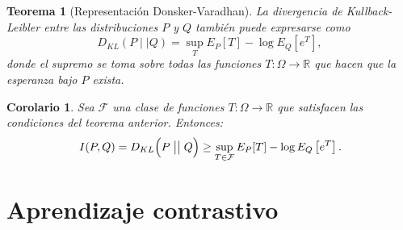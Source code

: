 \documentclass[aspectratio=169]{beamer}
\newcommand\KL[2]{D_{KL}\Big(#1 \bigm|\bigm| #2\Big)}
\newcommand{\R}{\mathbb{R}}
\newtheorem{nth}{Teorema}
\newtheorem{cor}{Corolario}
\begin{document}
\begin{frame}
  
  
  \begin{nth}[Representación Donsker-Varadhan]
  La divergencia de Kullback-Leibler entre las distribuciones \(P\) y \(Q\) también puede expresarse como
  \[
  D_{KL}(P \mid \mid Q) = \sup_{T} E_P[T] - \log E_Q\left[e^T\right],
  \]
  donde el supremo se toma sobre todas las funciones \(T: \Omega \to \R \) que hacen que la esperanza bajo \( P \) exista.
  \end{nth}
  \pause
  \begin{cor}
  Sea \(\mathcal F\) una clase de funciones \( T : \Omega \to \R \) que satisfacen las condiciones del teorema anterior. Entonces:
  \[
  I(P,Q) = \KL{P}{Q}  \geq \sup_{T \in \mathcal F} E_P[T] - \log E_Q\left[e^T\right].
  \]
  \end{cor}
  \end{frame}

  \section{Aprendizaje contrastivo}
\end{document}
